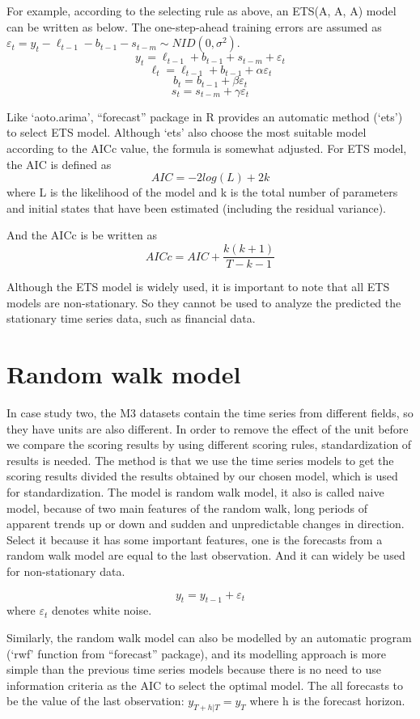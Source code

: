 \documentclass{monashthesis}
\theoremstyle{definition}
\theoremstyle{definition}
\theoremstyle{definition}
\theoremstyle{remark}
\begin{document}
For example, according to the selecting rule as above, an ETS(A, A, A)
model can be written as below. The one-step-ahead training errors are
assumed as
\(\varepsilon_t=y_t-\ell_{t-1}-b_{t-1}-s_{t-m}\sim{NID(0,\sigma^2)}\).
\[y_t=\ell_{t-1}+b_{t-1}+s_{t-m}+\varepsilon_t\]
\[\ell_t=\ell_{t-1}+b_{t-1}+\alpha\varepsilon_t\]
\[b_t=b_{t-1}+\beta\varepsilon_t\] \[s_t=s_{t-m}+\gamma\varepsilon_t\]

Like `aoto.arima', ``forecast'' package in R provides an automatic
method (`ets') to select ETS model. Although `ets' also choose the most
suitable model according to the AICc value, the formula is somewhat
adjusted. For ETS model, the AIC is defined as \[AIC=-2log(L)+2k\] where
L is the likelihood of the model and k is the total number of parameters
and initial states that have been estimated (including the residual
variance).

And the AICc is be written as \[AICc=AIC+\frac{k(k+1)}{T-k-1}\]

Although the ETS model is widely used, it is important to note that all
ETS models are non-stationary. So they cannot be used to analyze the
predicted the stationary time series data, such as financial data.

\section{Random walk model}\label{random-walk-model}

In case study two, the M3 datasets contain the time series from
different fields, so they have units are also different. In order to
remove the effect of the unit before we compare the scoring results by
using different scoring rules, standardization of results is needed. The
method is that we use the time series models to get the scoring results
divided the results obtained by our chosen model, which is used for
standardization. The model is random walk model, it also is called naive
model, because of two main features of the random walk, long periods of
apparent trends up or down and sudden and unpredictable changes in
direction. Select it because it has some important features, one is the
forecasts from a random walk model are equal to the last observation.
And it can widely be used for non-stationary data.

\[y_t=y_{t-1}+\varepsilon_t\] where \(\varepsilon_t\) denotes white
noise.

Similarly, the random walk model can also be modelled by an automatic
program (`rwf' function from ``forecast'' package), and its modelling
approach is more simple than the previous time series models because
there is no need to use information criteria as the AIC to select the
optimal model. The all forecasts to be the value of the last
observation: \(\hat{y_{T+h|T}=y_T}\) where h is the forecast horizon.
\end{document}
